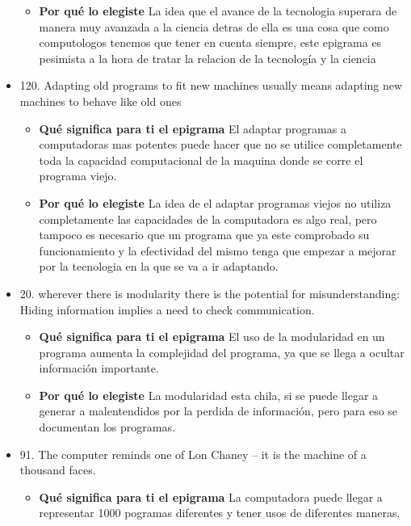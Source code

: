 \documentclass{article}
\begin{document}
\begin{itemize}
\begin{itemize}
                
            \item \textbf{ Por qué lo elegiste}
            \newline La idea que el avance de la tecnologia superara de manera muy avanzada a la ciencia detras de ella es una cosa que como computologos tenemos que tener en cuenta siempre, este epigrama es pesimista a la hora de tratar la relacion de la tecnología y la ciencia
        \end{itemize}
    \item 120. Adapting old programs to fit new machines usually means adapting new machines to behave like old ones
            \begin{itemize}
            \item \textbf{ Qué significa para ti el epigrama} 
                \newline El adaptar programas a computadoras mas potentes puede hacer que no se utilice completamente toda la capacidad computacional de la maquina donde se corre el programa viejo.
            
                
            \item \textbf{ Por qué lo elegiste}
            \newline La idea de el adaptar programas viejos no utiliza completamente las capacidades de la computadora es algo real, pero tampoco es necesario que un programa que ya este comprobado su funcionamiento y la efectividad del mismo tenga que empezar a mejorar por la tecnologia en la que se va a ir adaptando.
        \end{itemize}
    \item 20. wherever there is modularity there is the potential for misunderstanding: Hiding information implies a need to check communication.
            \begin{itemize}
            \item \textbf{ Qué significa para ti el epigrama} 
            \newline El uso de la modularidad en un programa aumenta la complejidad del programa, ya que se llega a ocultar información importante.
                
            
                
            \item \textbf{ Por qué lo elegiste}
            \newline La modularidad esta chila, si se puede llegar a generar a malentendidos por la perdida de información, pero para eso se documentan los programas.
        \end{itemize}
    \item 91. The computer reminds one of Lon Chaney – it is the machine of a thousand faces.
            \begin{itemize}
            \item \textbf{ Qué significa para ti el epigrama} 
            \newline La computadora puede llegar a representar 1000 pogramas diferentes y tener usos de diferentes maneras.
                

\end{itemize}
\end{itemize}
\end{document}
